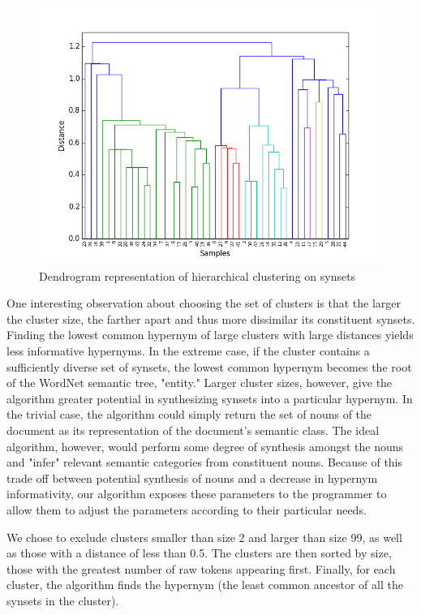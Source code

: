 \documentclass[11pt]{article}
\begin{document}
\begin{figure}[t]
\caption{Dendrogram representation of hierarchical clustering on synsets}
\centering
\includegraphics[width=\textwidth]{hca}
\end{figure}

One interesting observation about choosing the set of clusters is that the larger the cluster size, the farther apart and thus more dissimilar its constituent synsets. Finding the lowest common hypernym of large clusters with large distances yields less informative hypernyms. In the extreme case, if the cluster contains a sufficiently diverse set of synsets, the lowest common hypernym becomes the root of the WordNet semantic tree, "entity." Larger cluster sizes, however, give the algorithm greater potential in synthesizing synsets into a particular hypernym. In the trivial case, the algorithm could simply return the set of nouns of the document as its representation of the document's semantic class. The ideal algorithm, however, would perform some degree of synthesis amongst the nouns and "infer" relevant semantic categories from constituent nouns. Because of this trade off between potential synthesis of nouns and a decrease in hypernym informativity, our algorithm exposes these parameters to the programmer to allow them to adjust the parameters according to their particular needs.

We chose to exclude clusters smaller than size 2 and larger than size 99, as well as those with a distance of less than 0.5. The clusters are then sorted by size, those with the greatest number of raw tokens appearing first. Finally, for each cluster, the algorithm finds the hypernym (the least common ancestor of all the synsets in the cluster).
\end{document}

